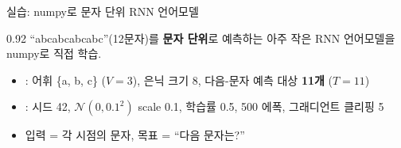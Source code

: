 \begin{frame}{실습: numpy로 문자 단위 RNN 언어모델}
\begin{center}\begin{varwidth}{0.92\textwidth}
  ``abcabcabcabc''(12문자)를 \textbf{문자 단위}로 예측하는 아주
  작은 RNN 언어모델을 numpy로 직접 학습.
  \begin{itemize}
    \item {}: 어휘 \{a, b, c\} ($V=3$), 은닉 크기 8,
      다음-문자 예측 대상 \textbf{11개} ($T=11$)
    \item {}: 시드 42, $\mathcal{N}(0, 0.1^2)$ scale 0.1,
      학습률 0.5, 500 에폭, 그래디언트 클리핑 5
    \item 입력 = 각 시점의 문자, 목표 = ``다음 문자는?''
  \end{itemize}
\end{varwidth}\end{center}
\end{frame}
